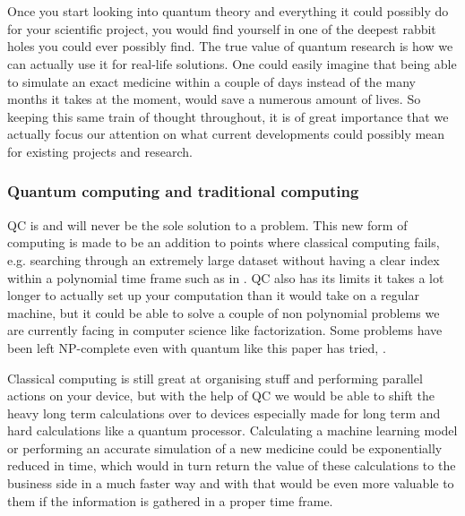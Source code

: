 
\chapter{}
\label{ch:computing-with-quantum}

Once you start looking into quantum theory and everything it could possibly do for your scientific project, you would find yourself in one of the deepest rabbit holes you could ever possibly find. The true value of quantum research is how we can actually use it for real-life solutions. One could easily imagine that being able to simulate an exact medicine within a couple of days instead of the many months it takes at the moment, would save a numerous amount of lives. So keeping this same train of thought throughout, it is of great importance that we actually focus our attention on what current developments could possibly mean for existing projects and research.

\subsection{Quantum computing and traditional computing}

QC is and will never be the sole solution to a problem. This new form of computing is made to be an addition to points where classical computing fails, e.g. searching through an extremely large dataset without having a clear index within a polynomial time frame such as in \textcite{Terhal1998}. QC also has its limits it takes a lot longer to actually set up your computation than it would take on a regular machine, but it could be able to solve a couple of non polynomial problems we are currently facing in computer science like factorization. Some problems have been left NP-complete even with quantum like this paper has tried, \textcite{Wang2007}. 

Classical computing is still great at organising stuff and performing parallel actions on your device, but with the help of QC we would be able to shift the heavy long term calculations over to devices especially made for long term and hard calculations like a quantum processor. Calculating a machine learning model \textcite{Schuld2014} or performing an accurate simulation of a new medicine could be exponentially reduced in time, which would in turn return the value of these calculations to the business side in a much faster way and with that would be even more valuable to them if the information is gathered in a proper time frame. \autocite{Schuld2015} \autocite{Troyer2005}

